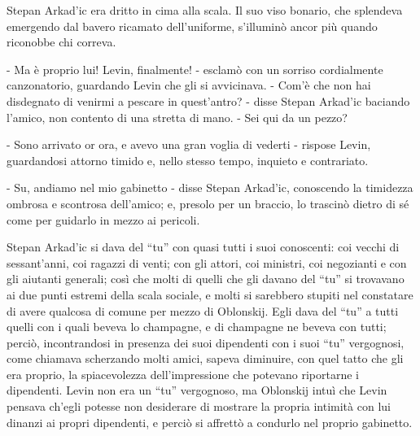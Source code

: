 Stepan Arkad'ic era dritto in cima alla scala. Il suo viso bonario, che splendeva emergendo dal bavero ricamato dell'uniforme, s'illuminò ancor più quando riconobbe chi correva. 

- Ma è proprio lui! Levin, finalmente! - esclamò con un sorriso cordialmente canzonatorio, guardando Levin che gli si avvicinava. - Com'è che non hai disdegnato di venirmi a pescare in quest'antro? - disse Stepan Arkad'ic baciando l'amico, non contento di una stretta di mano. - Sei qui da un pezzo? 

- Sono arrivato or ora, e avevo una gran voglia di vederti - rispose Levin, guardandosi attorno timido e, nello stesso tempo, inquieto e contrariato. 

- Su, andiamo nel mio gabinetto - disse Stepan Arkad'ic, conoscendo la timidezza ombrosa e scontrosa dell'amico; e, presolo per un braccio, lo trascinò dietro di sé come per guidarlo in mezzo ai pericoli. 

Stepan Arkad'ic si dava del ``tu'' con quasi tutti i suoi conoscenti: coi vecchi di sessant'anni, coi ragazzi di venti; con gli attori, coi ministri, coi negozianti e con gli aiutanti generali; così che molti di quelli che gli davano del ``tu'' si trovavano ai due punti estremi della scala sociale, e molti si sarebbero stupiti nel constatare di avere qualcosa di comune per mezzo di Oblonskij. Egli dava del ``tu'' a tutti quelli con i quali beveva lo champagne, e di champagne ne beveva con tutti; perciò, incontrandosi in presenza dei suoi dipendenti con i suoi ``tu'' vergognosi, come chiamava scherzando molti amici, sapeva diminuire, con quel tatto che gli era proprio, la spiacevolezza dell'impressione che potevano riportarne i dipendenti. Levin non era un ``tu'' vergognoso, ma Oblonskij intuì che Levin pensava ch'egli potesse non desiderare di mostrare la propria intimità con lui dinanzi ai propri dipendenti, e perciò si affrettò a condurlo nel proprio gabinetto. 

